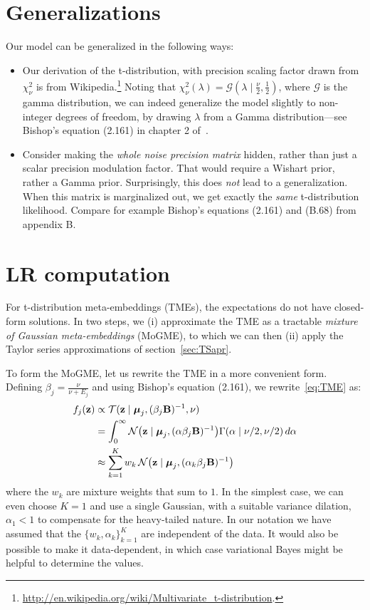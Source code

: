 \documentclass[a4paper,oneside,12pt,english]{report}
\def\zvec{\mathbf{z}}
\def\ND{\mathcal{N}}
\def\Bmat{\mathbf{B}}
\def\muvec{\boldsymbol{\mu}}
\begin{document}
\section{Generalizations}
\def\GD{\mathcal{G}}
Our model can be generalized in the following ways:
\begin{itemize}
	\item Our derivation of the t-distribution, with precision scaling factor drawn from $\chi^2_\nu$ is from Wikipedia.\footnote{\url{http://en.wikipedia.org/wiki/Multivariate_t-distribution}.} Noting that $\chi^2_\nu(\lambda)=\GD(\lambda\mid\tfrac{\nu}{2},\tfrac12)$, where $\GD$ is the gamma distribution, we can indeed generalize the model slightly to non-integer degrees of freedom, by drawing $\lambda$ from a Gamma distribution---see Bishop's equation (2.161) in chapter 2 of~\cite{PRML}. 
%
	\item Consider making the \emph{whole noise precision matrix} hidden, rather than just a scalar precision modulation factor. That would require a Wishart prior, rather a Gamma prior. Surprisingly, this does \emph{not} lead to a generalization. When this matrix is marginalized out, we get exactly the \emph{same} t-distribution likelihood. Compare for example Bishop's equations (2.161) and (B.68) from appendix B.
\end{itemize}

\section{LR computation}
For t-distribution meta-embeddings (TMEs), the expectations do not have closed-form solutions. In two steps, we (i) approximate the TME as a tractable \emph{mixture of Gaussian meta-embeddings} (MoGME), to which we can then (ii) apply the Taylor series approximations of section~\ref{sec:TSapr}. 

To form the MoGME, let us rewrite the TME in a more convenient form. Defining $\beta_j = \frac{\nu}{\nu+E_j}$ and using Bishop's equation (2.161), we rewrite~\eqref{eq:TME} as:
\begin{align}
\begin{split}
f_j(\zvec) &\propto \TD(\zvec\mid \muvec_j,(\beta_j\Bmat)^{-1},\nu) \\
&= \int_0^{\infty} \ND\bigl(\zvec\mid \muvec_j,(\alpha\beta_j\Bmat)^{-1}\bigr)\Gamma(\alpha\mid\nu/2,\nu/2)\,d\alpha\\
&\approx\sum_{k=1}^K w_k\, \ND\bigl(\zvec\mid \muvec_j,(\alpha_k\beta_j\Bmat)^{-1}\bigr)
\end{split}
\end{align} 
where the $w_k$ are mixture weights that sum to $1$. In the simplest case, we can even choose $K=1$ and use a single Gaussian, with a suitable variance dilation, $\alpha_1<1$ to compensate for the heavy-tailed nature. In our notation we have assumed that the $\{w_k,\alpha_k\}_{k=1}^K$ are independent of the data. It would also be possible to make it data-dependent, in which case variational Bayes might be helpful to determine the values. 
\end{document}
